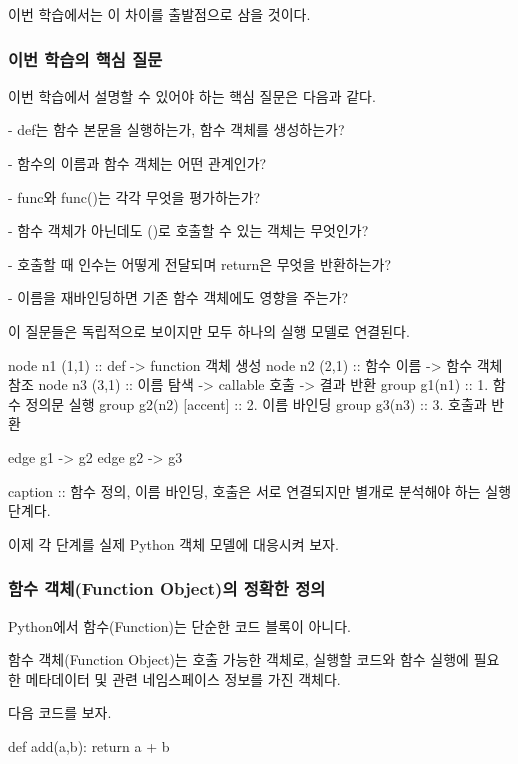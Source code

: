 이번 학습에서는 이 차이를 출발점으로 삼을 것이다.

\subsubsection{이번 학습의 핵심 질문}

이번 학습에서 설명할 수 있어야 하는 핵심 질문은 다음과 같다.

\begin{dhksmry}
- def는 함수 본문을 실행하는가, 함수 객체를 생성하는가?

- 함수의 이름과 함수 객체는 어떤 관계인가?

- func와 func()는 각각 무엇을 평가하는가?

- 함수 객체가 아닌데도 ()로 호출할 수 있는 객체는 무엇인가?

- 호출할 때 인수는 어떻게 전달되며 return은 무엇을 반환하는가?

- 이름을 재바인딩하면 기존 함수 객체에도 영향을 주는가?
\end{dhksmry}

이 질문들은 독립적으로 보이지만 모두 하나의 실행 모델로 연결된다.

\begin{dhkgraph}[uniform]
node n1 (1,1) :: def -> function 객체 생성
node n2 (2,1) :: 함수 이름 -> 함수 객체 참조
node n3 (3,1) :: 이름 탐색 -> callable 호출 -> 결과 반환
group g1(n1) :: 1. 함수 정의문 실행
group g2(n2) [accent] :: 2. 이름 바인딩
group g3(n3) :: 3. 호출과 반환

edge g1 -> g2
edge g2 -> g3

caption :: 함수 정의, 이름 바인딩, 호출은 서로 연결되지만 별개로 분석해야 하는 실행 단계다.
\end{dhkgraph}

이제 각 단계를 실제 Python 객체 모델에 대응시켜 보자.

\subsubsection{함수 객체(Function Object)의 정확한 정의}

Python에서 함수(Function)는 단순한 코드 블록이 아니다.

함수 객체(Function Object)는 호출 가능한 객체로, 실행할 코드와 함수 실행에 필요한 메타데이터 및 관련 네임스페이스 정보를 가진 객체다.

다음 코드를 보자.

\begin{dhkcode}
def add(a,b):
    return a + b
\end{dhkcode}

